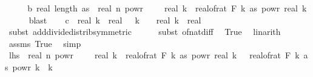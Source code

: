 \begin{isabellebody}
\ \ \isamarkupfalse%
\ \isamarkupfalse%
\ b{\isacharcolon}{\kern0pt}\ {\isachardoublequoteopen}real\ {\isacharparenleft}{\kern0pt}length\ as{\isacharparenright}{\kern0pt}\ {\isasymle}\ real\ n\ powr\ {\isacharparenleft}{\kern0pt}{}\ {\isacharminus}{\kern0pt}\ {}\ {\isacharslash}{\kern0pt}\ real\ k{\isacharparenright}{\kern0pt}\ {\isacharasterisk}{\kern0pt}\ real{\isacharunderscore}{\kern0pt}of{\isacharunderscore}{\kern0pt}rat\ {\isacharparenleft}{\kern0pt}F\ k\ as{\isacharparenright}{\kern0pt}\ powr\ {\isacharparenleft}{\kern0pt}{}{\isacharslash}{\kern0pt}real\ k{\isacharparenright}{\kern0pt}{\isachardoublequoteclose}\isanewline
\ \ \ \ \isamarkupfalse%
\ blast\isanewline
\isanewline
\ \ \isamarkupfalse%
\ c{\isacharcolon}{\kern0pt}{\isachardoublequoteopen}{}\ {\isacharslash}{\kern0pt}\ real\ k\ {\isacharplus}{\kern0pt}\ real\ {\isacharparenleft}{\kern0pt}{}\ {\isacharasterisk}{\kern0pt}\ k\ {\isacharminus}{\kern0pt}\ {}{\isacharparenright}{\kern0pt}\ {\isacharslash}{\kern0pt}\ real\ k\ {\isacharequal}{\kern0pt}\ real\ {}{\isachardoublequoteclose}\isanewline
\ \ \ \ \isamarkupfalse%
\ {\isacharparenleft}{\kern0pt}subst\ add{\isacharunderscore}{\kern0pt}divide{\isacharunderscore}{\kern0pt}distrib{\isacharbrackleft}{\kern0pt}symmetric{\isacharbrackright}{\kern0pt}{\isacharparenright}{\kern0pt}\isanewline
\ \ \ \ \isamarkupfalse%
\ {\isacharparenleft}{\kern0pt}subst\ of{\isacharunderscore}{\kern0pt}nat{\isacharunderscore}{\kern0pt}diff{\isacharparenright}{\kern0pt}\ \isamarkupfalse%
\ True\ \isamarkupfalse%
\ linarith\isanewline
\ \ \ \ \isamarkupfalse%
\ assms{\isacharparenleft}{\kern0pt}{}{\isacharparenright}{\kern0pt}\ True\ \isamarkupfalse%
\ simp\isanewline
\isanewline
\ \ \isamarkupfalse%
\ {\isachardoublequoteopen}{\isacharquery}{\kern0pt}lhs\ {\isasymle}\ real\ n\ powr\ {\isacharparenleft}{\kern0pt}{}\ {\isacharminus}{\kern0pt}\ {}\ {\isacharslash}{\kern0pt}\ real\ k{\isacharparenright}{\kern0pt}\ {\isacharasterisk}{\kern0pt}\ real{\isacharunderscore}{\kern0pt}of{\isacharunderscore}{\kern0pt}rat\ {\isacharparenleft}{\kern0pt}F\ k\ as{\isacharparenright}{\kern0pt}\ powr\ {\isacharparenleft}{\kern0pt}{}{\isacharslash}{\kern0pt}real\ k{\isacharparenright}{\kern0pt}\ {\isacharasterisk}{\kern0pt}\ \ {\isacharparenleft}{\kern0pt}real{\isacharunderscore}{\kern0pt}of{\isacharunderscore}{\kern0pt}rat\ {\isacharparenleft}{\kern0pt}F\ k\ as{\isacharparenright}{\kern0pt}{\isacharparenright}{\kern0pt}\ powr\ {\isacharparenleft}{\kern0pt}{\isacharparenleft}{\kern0pt}{}{\isacharasterisk}{\kern0pt}k{\isacharminus}{\kern0pt}{}{\isacharparenright}{\kern0pt}\ {\isacharslash}{\kern0pt}\ k{\isacharparenright}{\kern0pt}{\isachardoublequoteclose}\isanewline

\end{isabellebody}
